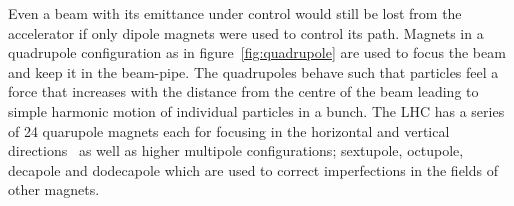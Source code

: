 Even a beam with its emittance under control would still be lost from the
accelerator if only dipole magnets were used to control its path. Magnets in a
quadrupole configuration as in figure~\ref{fig:quadrupole} are used to focus the
beam and keep it in the beam-pipe. The quadrupoles behave such that particles
feel a force that increases with the distance from the centre of the beam
leading to simple harmonic motion of individual particles in a bunch. The LHC
has a series of 24 quarupole magnets each for focusing in the horizontal and vertical
directions~\cite{LHC-dr} as well as higher multipole configurations;
sextupole, octupole, decapole and dodecapole which are used to correct
imperfections in the fields of other magnets.


